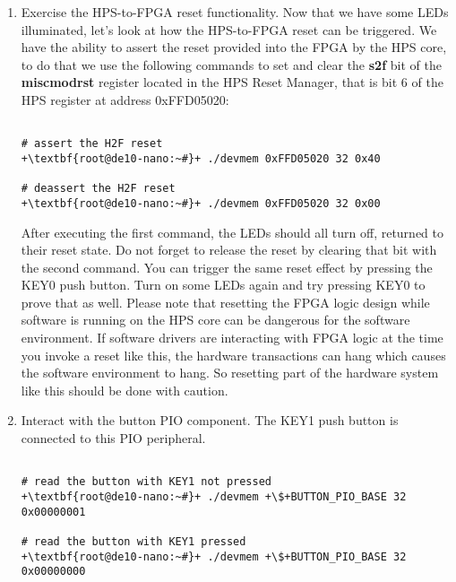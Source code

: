 \begin{flushleft}
\begin{enumerate}[
	label=\textbf{Step \arabic*.},
	leftmargin=*,
	widest={00},
	align=left]
\begin{enumerate}[
	label=\textbf{Step \arabic{enumi}\alph*.},
	leftmargin=*,
	align=left]
\begin{verbatim}
# turn on all of the LEDs
|\textbf{root@de10-nano:~#}| ./devmem |\$|LED_PIO_BASE 32 0xff

\end{verbatim}

\item Exercise the HPS-to-FPGA reset functionality.  Now that we have some LEDs illuminated, let's look at how the HPS-to-FPGA reset can be triggered.  We have the ability to assert the reset provided into the FPGA by the HPS core, to do that we use the following commands to set and clear the \textbf{s2f} bit of the \textbf{miscmodrst} register located in the HPS Reset Manager, that is bit 6 of the HPS register at address 0xFFD05020:

\begin{verbatim}

# assert the H2F reset
+\textbf{root@de10-nano:~#}+ ./devmem 0xFFD05020 32 0x40

# deassert the H2F reset
+\textbf{root@de10-nano:~#}+ ./devmem 0xFFD05020 32 0x00

\end{verbatim}

After executing the first command, the LEDs should all turn off, returned to their reset state.  Do not forget to release the reset by clearing that bit with the second command.  You can trigger the same reset effect by pressing the KEY0 push button.  Turn on some LEDs again and try pressing KEY0 to prove that as well.
\newline
\newline
Please note that resetting the FPGA logic design while software is running on the HPS core can be dangerous for the software environment.  If software drivers are interacting with FPGA logic at the time you invoke a reset like this, the hardware transactions can hang which causes the software environment to hang.  So resetting part of the hardware system like this should be done with caution.

\item Interact with the button PIO component.  The KEY1 push button is connected to this PIO peripheral.

\begin{verbatim}

# read the button with KEY1 not pressed
+\textbf{root@de10-nano:~#}+ ./devmem +\$+BUTTON_PIO_BASE 32
0x00000001

# read the button with KEY1 pressed
+\textbf{root@de10-nano:~#}+ ./devmem +\$+BUTTON_PIO_BASE 32
0x00000000


\end{verbatim}
\end{enumerate}
\end{enumerate}
\end{flushleft}
